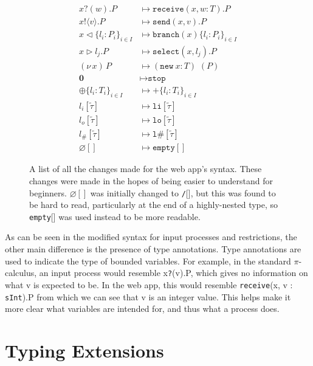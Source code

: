 \documentclass{l4proj}
\begin{document}
\begin{figure}[H]
\begin{align*}
x\texttt{?}(w).P &\longmapsto \texttt{receive}(x, w : T).P \\
x\texttt{!}\langle v \rangle.P &\longmapsto \texttt{send}(x, v).P \\
x \triangleleft \{l_{i}:P_{i}\}_{i \in I} &\longmapsto \texttt{branch}(x) \{l_{i}:P_{i}\}_{i \in I} \\
x \triangleright l_{j}.P &\longmapsto \texttt{select}(x, l_{j}).P \\
(\nu\,x)\,P &\longmapsto (\texttt{new}\:x : T)\,\,(P) \\
\textbf{0} &\longmapsto \texttt{stop} \\[1.75ex]
\oplus\{l_{i}:T_{i}\}_{i \in I} &\longmapsto +\{l_{i}:T_{i}\}_{i \in I} \\
l_{i}[\tilde{\tau}] &\longmapsto \texttt{li}[\tilde{\tau}] \\
l_{o}[\tilde{\tau}] &\longmapsto \texttt{lo}[\tilde{\tau}] \\
l_{\#}[\tilde{\tau}] &\longmapsto \texttt{l\#}[\tilde{\tau}] \\
\varnothing [] &\longmapsto \texttt{empty}[]
\end{align*}
\caption{A list of all the changes made for the web app's syntax. These changes were made in the hopes of being easier to understand for beginners. $\varnothing[]$ was initially changed to \texttt{/}[], but this was found to be hard to read, particularly at the end of a highly-nested type, so \texttt{empty}[] was used instead to be more readable.}
\label{fig:syntaxDiff}
\end{figure}

As can be seen in the modified syntax for input processes and restrictions, the other main difference is the presence of type annotations. Type annotations are used to indicate the type of bounded variables. For example, in the standard $\pi$-calculus, an input process would resemble x\texttt{?}(v).P, which gives no information on what v is expected to be. In the web app, this would resemble \texttt{receive}(x, v : \texttt{sInt}).P from which we can see that v is an integer value. This helps make it more clear what variables are intended for, and thus what a process does.

\section{Typing Extensions}
\label{dsnTypeExt}
\end{document}

